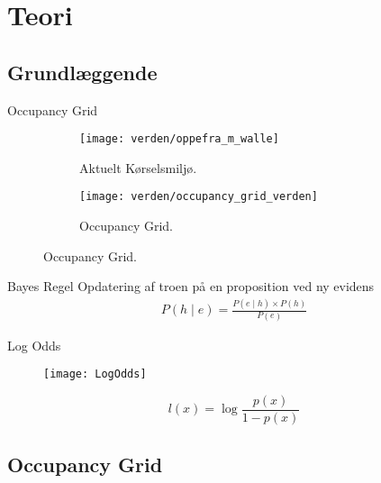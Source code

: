 \section{Teori}
\subsection{Grundlæggende}
\begin{frame}{Occupancy Grid}
\begin{figure}[h] %
\centering
	\begin{subfigure}[b]{.48\textwidth}
	\centering
	\texttt{[image: verden/oppefra\_m\_walle]}
	\caption{Aktuelt Kørselsmiljø.}
	\label{map:world}
	\end{subfigure}
	\hfill
	\begin{subfigure}[b]{.48\textwidth}
	\centering
	\texttt{[image: verden/occupancy\_grid\_verden]}
	\caption{Occupancy Grid.}
	\label{map:occupancy_grid}
	\end{subfigure}

\end{figure}
\end{frame}
\begin{frame}{Bayes Regel}
Opdatering af troen på en proposition ved ny evidens
\[
\begin{split}
P(h \mid e) = \frac{P(e \mid h) \times P(h)}{P(e)}
\end{split}
\]
\end{frame}

\begin{frame}{Log Odds}
\begin{figure}
\centering \texttt{[image: LogOdds]}
\label{logoddsimg}
\end{figure}

%

\[
l(x) = \log \frac{p(x)}{1 - p(x)}
\]

\end{frame}

\subsection{Occupancy Grid}

